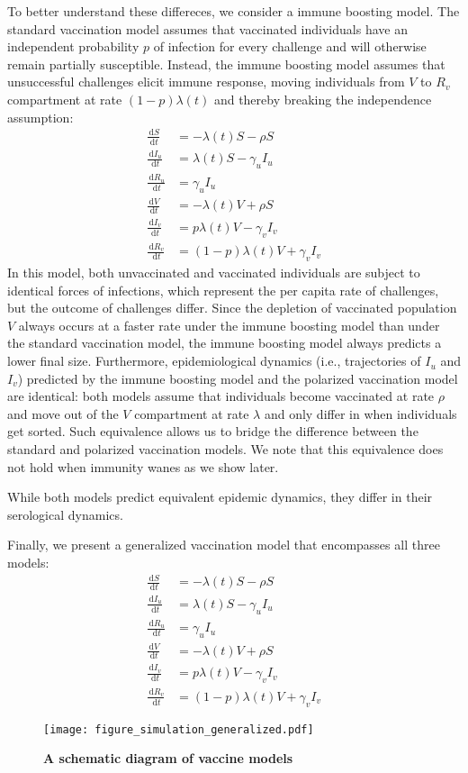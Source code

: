 \documentclass[12pt]{article}
\newcommand{\dd}[1]{\ensuremath{\, \mathrm{d}#1}}
\begin{document}
To better understand these differeces, we consider a immune boosting model.
The standard vaccination model assumes that vaccinated individuals have an independent probability $p$ of infection for every challenge and will otherwise remain partially susceptible.
Instead, the immune boosting model assumes that unsuccessful challenges elicit immune response, moving individuals from $V$ to $R_v$ compartment at rate $(1-p) \lambda(t)$ and thereby breaking the independence assumption: 
\begin{align}
\frac{\dd S}{\dd t} &= - \lambda(t) S - \rho S \\
\frac{\dd I_u}{\dd t} &= \lambda(t) S - \gamma_u I_u \\
\frac{\dd R_u}{\dd t} &= \gamma_u I_u \\
\frac{\dd V}{\dd t} &= - \lambda(t) V + \rho S \\
\frac{\dd I_v}{\dd t} &= p \lambda(t) V - \gamma_v I_v \\
\frac{\dd R_v}{\dd t} &= (1-p) \lambda(t) V + \gamma_v I_v
\end{align}
In this model, both unvaccinated and vaccinated individuals are subject to identical forces of infections, which represent the per capita rate of challenges, but the outcome of challenges differ.
Since the depletion of vaccinated population $V$ always occurs at a faster rate under the immune boosting model than under the standard vaccination model, the immune boosting model always predicts a lower final size.
Furthermore, epidemiological dynamics (i.e., trajectories of $I_u$ and $I_v$) predicted by the immune boosting model and the polarized vaccination model are identical: 
both models assume that individuals become vaccinated at rate $\rho$ and move out of the $V$ compartment at rate $\lambda$ and only differ in when individuals get sorted.
Such equivalence allows us to bridge the difference between the standard and polarized vaccination models.
We note that this equivalence does not hold when immunity wanes as we show later.

While both models predict equivalent epidemic dynamics, they differ in their serological dynamics.

Finally, we present a generalized vaccination model that encompasses all three models:
\begin{align}
\frac{\dd S}{\dd t} &= - \lambda(t) S - \rho S \\
\frac{\dd I_u}{\dd t} &= \lambda(t) S - \gamma_u I_u \\
\frac{\dd R_u}{\dd t} &= \gamma_u I_u \\
\frac{\dd V}{\dd t} &= - \lambda(t) V + \rho S \\
\frac{\dd I_v}{\dd t} &= p \lambda(t) V - \gamma_v I_v \\
\frac{\dd R_v}{\dd t} &= (1-p) \lambda(t) V + \gamma_v I_v
\end{align}



\begin{figure}[!tp]
\texttt{[image: figure\_simulation\_generalized.pdf]}
\caption{
\textbf{A schematic diagram of vaccine models}
}
\end{figure}

 
\end{document}
